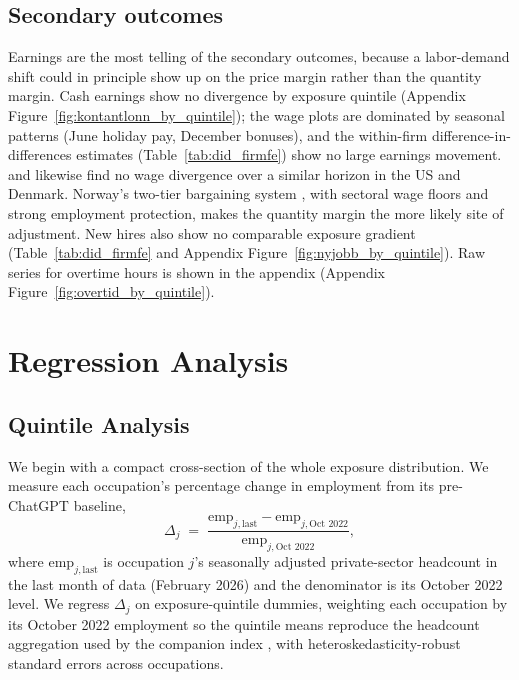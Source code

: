 \documentclass[12pt]{article}
\begin{document}
\subsection{Secondary outcomes}\label{sec:results:extensions}

Earnings are the most telling of the secondary outcomes, because a labor-demand shift could in principle show up on the price margin rather than the quantity margin. Cash earnings show no divergence by exposure quintile (Appendix Figure~\ref{fig:kontantlonn_by_quintile}); the wage plots are dominated by seasonal patterns (June holiday pay, December bonuses), and the within-firm difference-in-differences estimates (Table~\ref{tab:did_firmfe}) show no large earnings movement. \citet{brynjolfsson2025} and \citet{humlum2026} likewise find no wage divergence over a similar horizon in the US and Denmark. Norway's two-tier bargaining system \citep{bhuller2022}, with sectoral wage floors and strong employment protection, makes the quantity margin the more likely site of adjustment. New hires also show no comparable exposure gradient (Table~\ref{tab:did_firmfe} and Appendix Figure~\ref{fig:nyjobb_by_quintile}). Raw series for overtime hours is shown in the appendix (Appendix Figure~\ref{fig:overtid_by_quintile}). 


\section{Regression Analysis}\label{sec:regression}

\subsection{Quintile Analysis}\label{sec:regression:quintile}

We begin with a compact cross-section of the whole exposure distribution. We measure each occupation's percentage change in employment from its pre-ChatGPT baseline,
\[
\Delta_j \;=\; \frac{\text{emp}_{j,\text{last}} - \text{emp}_{j,\text{Oct }2022}}{\text{emp}_{j,\text{Oct }2022}},
\]
where $\text{emp}_{j,\text{last}}$ is occupation $j$'s seasonally adjusted private-sector headcount in the last month of data (February 2026) and the denominator is its October 2022 level. We regress $\Delta_j$ on exposure-quintile dummies, weighting each occupation by its October 2022 employment so the quintile means reproduce the headcount aggregation used by the companion index \citep{kiindeksen2026}, with heteroskedasticity-robust standard errors across occupations.
\end{document}
